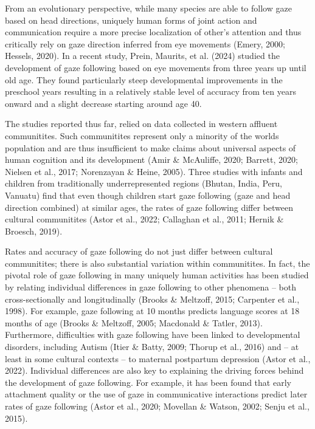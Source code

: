 \documentclass[
  man,floatsintext]{apa7}
\begin{document}
From an evolutionary perspective, while many species are able to follow gaze based on head directions, uniquely human forms of joint action and communication require a more precise localization of other's attention and thus critically rely on gaze direction inferred from eye movements (Emery, 2000; Hessels, 2020). In a recent study, Prein, Maurits, et al. (2024) studied the development of gaze following based on eye movements from three years up until old age. They found particularly steep developmental improvements in the preschool years resulting in a relatively stable level of accuracy from ten years onward and a slight decrease starting around age 40.

The studies reported thus far, relied on data collected in western affluent communitites. Such communitites represent only a minority of the worlds population and are thus insufficient to make claims about universal aspects of human cognition and its development (Amir \& McAuliffe, 2020; Barrett, 2020; Nielsen et al., 2017; Norenzayan \& Heine, 2005). Three studies with infants and children from traditionally underrepresented regions (Bhutan, India, Peru, Vanuatu) find that even though children start gaze following (gaze and head direction combined) at similar ages, the rates of gaze following differ between cultural communitites (Astor et al., 2022; Callaghan et al., 2011; Hernik \& Broesch, 2019).

Rates and accuracy of gaze following do not just differ between cultural communitites; there is also substantial variation within communitites. In fact, the pivotal role of gaze following in many uniquely human activities has been studied by relating individual differences in gaze following to other phenomena -- both cross-sectionally and longitudinally (Brooks \& Meltzoff, 2015; Carpenter et al., 1998). For example, gaze following at 10 months predicts language scores at 18 months of age (Brooks \& Meltzoff, 2005; Macdonald \& Tatler, 2013). Furthermore, difficulties with gaze following have been linked to developmental disorders, including Autism (Itier \& Batty, 2009; Thorup et al., 2016) and -- at least in some cultural contexts -- to maternal postpartum depression (Astor et al., 2022). Individual differences are also key to explaining the driving forces behind the development of gaze following. For example, it has been found that early attachment quality or the use of gaze in communicative interactions predict later rates of gaze following (Astor et al., 2020; Movellan \& Watson, 2002; Senju et al., 2015).
\end{document}
